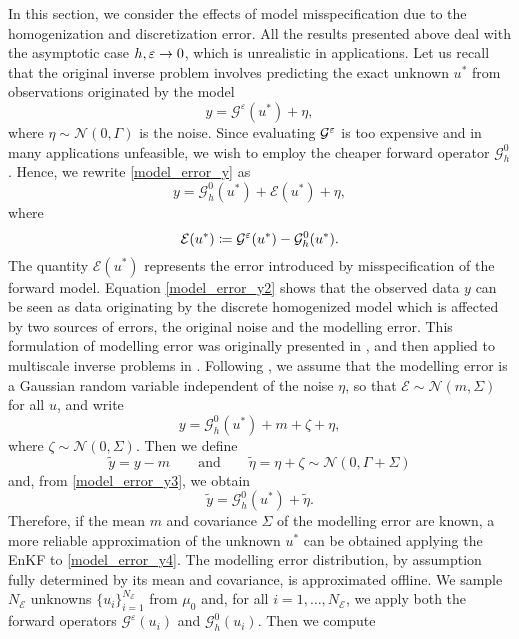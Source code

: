 In this section, we consider the effects of model misspecification due to the homogenization and discretization error. All the results presented above deal with the asymptotic case $h, \varepsilon \to 0$, which is unrealistic in applications. Let us recall that the original inverse problem involves predicting the exact unknown $u^*$ from observations originated by the model
\begin{equation}
\label{model_error_y}
y = \mathcal{G}^{\varepsilon}(u^*) + \eta,
\end{equation}
where $\eta \sim \mathcal{N}(0,\Gamma)$ is the noise. Since evaluating $\mathcal G^\varepsilon$ is too expensive and in many applications unfeasible, we wish to employ the cheaper forward operator $\mathcal{G}^0_h$. Hence, we rewrite \eqref{model_error_y} as
\begin{equation}
\label{model_error_y2}
y = \mathcal{G}^0_h(u^*) + \mathcal{E}(u^*) + \eta,
\end{equation}
where
\[ \mathcal{E}(u^*) \coloneqq \mathcal{G}^{\varepsilon}(u^*) - \mathcal{G}^0_h(u^*). \]
The quantity $\mathcal{E}(u^*)$ represents the error introduced by misspecification of the forward model. Equation \eqref{model_error_y2} shows that the observed data $y$ can be seen as data originating by the discrete homogenized model which is affected by two sources of errors, the original noise and the modelling error. This formulation of modelling error was originally presented in \cite{CES14}, and then applied to multiscale inverse problems in \cite{AbD18}. Following \cite{CES14, AbD18}, we assume that the modelling error is a Gaussian random variable independent of the noise $\eta$, so that $\mathcal{E} \sim \mathcal{N}(m, \Sigma)$ for all $u$, and write
\begin{equation}
\label{model_error_y3}
y = \mathcal{G}^0_h(u^*) + m + \zeta + \eta,
\end{equation}
where $\zeta \sim \mathcal{N}(0, \Sigma)$. Then we define
\[ \tilde{y} = y - m \qquad \text{and} \qquad \tilde{\eta} = \eta + \zeta \sim \mathcal{N}(0, \Gamma + \Sigma) \]
and, from \eqref{model_error_y3}, we obtain
\begin{equation}
\label{model_error_y4}
\tilde{y} = \mathcal{G}^0_h(u^*) + \tilde{\eta}.
\end{equation}
Therefore, if the mean $m$ and covariance $\Sigma$ of the modelling error are known, a more reliable approximation of the unknown $u^*$ can be obtained applying the EnKF to \eqref{model_error_y4}. The modelling error distribution, by assumption fully determined by its mean and covariance, is approximated offline. We sample $N_{\mathcal{E}}$ unknowns $\{ u_i \}_{i=1}^{N_\mathcal{E}}$ from $\mu_0$ and, for all $i = 1, \dots, N_{\mathcal{E}}$, we apply both the forward operators $\mathcal{G}^{\varepsilon}(u_i)$ and $\mathcal{G}^0_h(u_i)$. Then we compute
